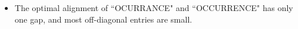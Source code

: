 \documentclass[mathserif]{beamer}
\begin{document}
{%
%                   
%                   
%
%    
%
%    
%
%
%                         
%
%

\begin{itemize}
	\item The optimal alignment of ``OCURRANCE" and ``OCCURRENCE" has only one gap, and most off-diagonal entries are small.
\end{itemize}
}
\end{document}
